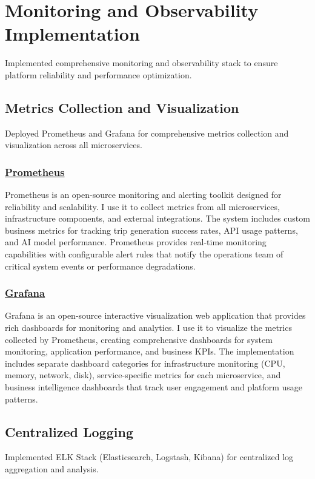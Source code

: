 \section{Monitoring and Observability Implementation}
Implemented comprehensive monitoring and observability stack to ensure platform reliability and performance optimization.

\subsection{Metrics Collection and Visualization}
Deployed Prometheus and Grafana for comprehensive metrics collection and visualization across all microservices.

\subsubsection*{\underline{Prometheus}}
Prometheus is an open-source monitoring and alerting toolkit designed for reliability and scalability. I use it to collect metrics from all microservices, infrastructure components, and external integrations. The system includes custom business metrics for tracking trip generation success rates, API usage patterns, and AI model performance. Prometheus provides real-time monitoring capabilities with configurable alert rules that notify the operations team of critical system events or performance degradations.

\subsubsection*{\underline{Grafana}}
Grafana is an open-source interactive visualization web application that provides rich dashboards for monitoring and analytics. I use it to visualize the metrics collected by Prometheus, creating comprehensive dashboards for system monitoring, application performance, and business KPIs. The implementation includes separate dashboard categories for infrastructure monitoring (CPU, memory, network, disk), service-specific metrics for each microservice, and business intelligence dashboards that track user engagement and platform usage patterns.

\subsection{Centralized Logging}
Implemented ELK Stack (Elasticsearch, Logstash, Kibana) for centralized log aggregation and analysis.

